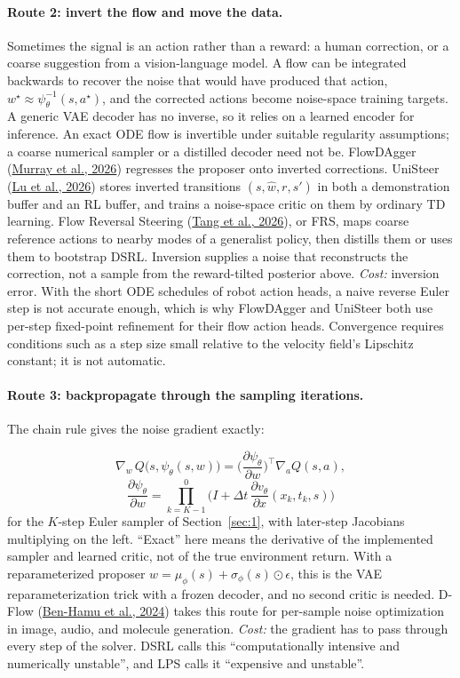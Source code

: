 \paragraph{Route 2: invert the flow and move the data.} Sometimes the signal is an action rather than a reward: a human correction, or a coarse suggestion from a vision-language model. A flow can be integrated backwards to recover the noise that would have produced that action, $w^\star \approx \psi_\theta^{-1}(s, a^\star)$, and the corrected actions become noise-space training targets. A generic VAE decoder has no inverse, so it relies on a learned encoder for inference. An exact ODE flow is invertible under suitable regularity assumptions; a coarse numerical sampler or a distilled decoder need not be. FlowDAgger (\hyperlink{ref:13}{Murray et al., 2026}) regresses the proposer onto inverted corrections. UniSteer (\hyperlink{ref:9}{Lu et al., 2026}) stores inverted transitions $(s, \hat w, r, s')$ in both a demonstration buffer and an RL buffer, and trains a noise-space critic on them by ordinary TD learning. Flow Reversal Steering (\hyperlink{ref:18}{Tang et al., 2026}), or FRS, maps coarse reference actions to nearby modes of a generalist policy, then distills them or uses them to bootstrap DSRL. Inversion supplies a noise that reconstructs the correction, not a sample from the reward-tilted posterior above. \emph{Cost:} inversion error. With the short ODE schedules of robot action heads, a naive reverse Euler step is not accurate enough, which is why FlowDAgger and UniSteer both use per-step fixed-point refinement for their flow action heads. Convergence requires conditions such as a step size small relative to the velocity field's Lipschitz constant; it is not automatic.

\paragraph{Route 3: backpropagate through the sampling iterations.} The chain rule gives the noise gradient exactly:

\begin{equation}
\nabla_w\, Q\big(s, \psi_\theta(s, w)\big) = \Big(\frac{\partial \psi_\theta}{\partial w}\Big)^{\!\top} \nabla_a Q(s, a),
\end{equation}
\begin{equation}
\frac{\partial \psi_\theta}{\partial w} = \prod_{k=K-1}^{0} \Big(I + \Delta t\, \frac{\partial v_\theta}{\partial x}(x_k, t_k, s)\Big)
\end{equation}
for the $K$-step Euler sampler of Section~\ref{sec:1}, with later-step Jacobians multiplying on the left. ``Exact'' here means the derivative of the implemented sampler and learned critic, not of the true environment return. With a reparameterized proposer $w = \mu_\phi(s) + \sigma_\phi(s) \odot \epsilon$, this is the VAE reparameterization trick with a frozen decoder, and no second critic is needed. D-Flow (\hyperlink{ref:1}{Ben-Hamu et al., 2024}) takes this route for per-sample noise optimization in image, audio, and molecule generation. \emph{Cost:} the gradient has to pass through every step of the solver. DSRL calls this ``computationally intensive and numerically unstable'', and LPS calls it ``expensive and unstable''.


